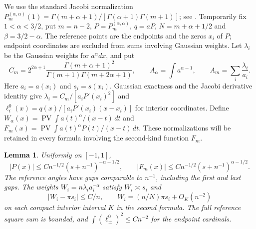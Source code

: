 \documentclass[a4paper,11pt]{amsart}
\newtheorem{lemma}[theorem]{Lemma}
\theoremstyle{remark}\newtheorem{remark}[theorem]{Remark}
\newcommand{\PV}{\operatorname{PV}}
\newcommand{\dd}{\,d}
\begin{document}
We use the standard Jacobi normalization $P_m^{(\alpha,\alpha)}(1)
=\Gamma(m+\alpha+1)/[\Gamma(\alpha+1)\Gamma(m+1)]$; see \cite{szego}.
Temporarily fix $1<\alpha<3/2$, put $m=n-2$, $P=P_m^{(\alpha,\alpha)}$,
$q=aP$, $N=m+\alpha+1/2$ and $\beta=3/2-\alpha$. The reference points
are the endpoints and the zeros $x_i$ of $P$; endpoint coordinates are
excluded from sums involving Gaussian weights. Let $\lambda_i$ be the
Gaussian weights for $a^\alpha dx$, and put
\begin{equation}\label{jacobi-constants}
 C_m=2^{2\alpha+1}\frac{\Gamma(m+\alpha+1)^2}
 {\Gamma(m+1)\Gamma(m+2\alpha+1)},\qquad
 A_\alpha=\int a^{\alpha-1},\qquad
 A_m=\sum_i\frac{\lambda_i}{a_i}.
\end{equation}
Here $a_i=a(x_i)$ and $s_i=s(x_i)$. Gaussian exactness and the
Jacobi derivative identity give
$\lambda_i=C_m/[a_iP'(x_i)^2]$ and
$\ell_i^0(x)=q(x)/[a_iP'(x_i)(x-x_i)]$ for interior coordinates.
Define
$W_\alpha(x)=\PV\int a(t)^\alpha/(x-t)\dd t$ and
$F_m(x)=\PV\int a(t)^\alpha P(t)/(x-t)\dd t$.
These normalizations will be retained in every formula involving the
second-kind function $F_m$.

\begin{lemma}\label{jacobi-estimates}
Uniformly on $[-1,1]$,
\begin{equation}\label{PF-bounds}
 |P(x)|\le Cn^{-1/2}(s+n^{-1})^{-\alpha-1/2},\qquad
 |F_m(x)|\le Cn^{-1/2}(s+n^{-1})^{\alpha-1/2}.
\end{equation}
The reference angles have gaps comparable to $n^{-1}$, including the
first and last gaps. The weights $W_i=n\lambda_i a_i^{-\alpha}$ satisfy
$W_i\asymp s_i$ and
\begin{equation}\label{weight-precision}
 |W_i-\pi s_i|\le C/n,\qquad
 W_i=(n/N)\pi s_i+O_K(n^{-2})
\end{equation}
on each compact interior interval $K$ in the second formula.
The full reference square sum is bounded, and
$\int (\ell_\pm^0)^2\le Cn^{-2}$ for the endpoint cardinals.
\end{lemma}
\end{document}
